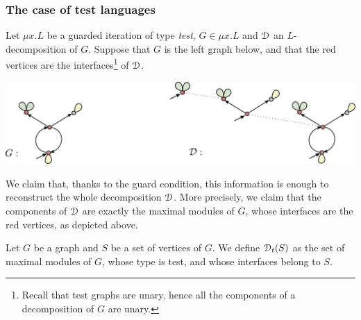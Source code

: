 \subsubsection{The case of  test languages}
Let $\mu x. L$ be a guarded iteration of type \emph{test}, $G\in \mu x. L$ and $\mathcal D$ an $L$-decomposition of $G$. Suppose that $G$ is the left graph below, and that the red vertices are the interfaces\footnote{Recall that test graphs are unary, hence all the components of a decomposition of $G$ are unary.} of $\mathcal D$.
\begin{center}
\includegraphics[scale=.33]{Pictures/decomp-test}
\end{center}
We claim that, thanks to the guard condition, this information is enough to reconstruct the whole decomposition $\mathcal D$. More precisely, we claim that the components of $\mathcal D$ are exactly the maximal modules of $G$, whose interfaces are the red vertices, as depicted above.




\begin{definition}  Let $G$ be a graph and $S$ be a set of vertices of $G$.   
We define $\cD_\mathsf{t}(S)$ as the set of maximal modules of $G$, whose type is test, and whose interfaces belong to $S$.  
\end{definition}

